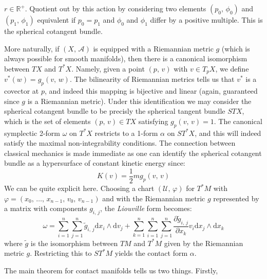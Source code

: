     $r\in\mathbb{R}^{+}$. Quotient out by this action by considering two
    elements $(p_{0},\,\phi_{0})$ and $(p_{1},\,\phi_{1})$ equivalent if
    $p_{0}=p_{1}$ and $\phi_{0}$ and $\phi_{1}$ differ by a positive multiple.
    This is the spherical cotangent bundle.
    \par\hfill\par
    More naturally, if $(X,\,\mathcal{A})$ is equipped with a Riemannian metric
    $g$ (which is always possible for smooth manifolds), then there is a
    canonical isomorphism between $TX$ and $T^{*}X$. Namely, given a point
    $(p,\,v)$ with $v\in{T}_{p}X$, we define
    $v^{*}(w)=g_{p}(v,\,w)$. The bilinearity of Riemannian metrics tells us
    that $v^{*}$ is a covector at $p$, and indeed this mapping is bijective
    and linear (again, guaranteed since $g$ is a Riemannian metric). Under this
    identification we may consider the spherical cotangent bundle to be
    precisly the spherical tangent bundle $STX$, which is the set of elements
    $(p,\,v)\in{TX}$ satisfying $g_{p}(v,\,v)=1$. The canonical symplectic
    2-form $\omega$ on $T^{*}X$ restricts to a 1-form $\alpha$ on
    $ST^{*}X$, and this will indeed satisfy the maximal non-integrability
    conditions. The connection between classical mechanics is made immediate
    as one can identify the spherical cotangent bundle as a hypersurface of
    constant kinetic energy since:
    \begin{equation}
        K(v)=\frac{1}{2}mg_{p}(v,\,v)
    \end{equation}
    We can be quite explicit here. Choosing a chart
    $(\mathcal{U},\,\varphi)$ for $T^{*}M$ with
    $\varphi=(x_{0},\,\dots,\,x_{n-1},\,v_{0},\,v_{n-1})$ and with the
    Riemannian metric $g$ represented by a matrix with components
    $g_{i,\,j}$, the \textit{Liouville} form becomes:
    \begin{equation}
        \omega=\sum_{i=1}^{n}\sum_{j=1}^{n}
            \tilde{g}_{i,\,j}\textrm{d}x_{i}\land\textrm{d}v_{j}+
        \sum_{k=1}^{n}\sum_{i=1}^{n}\sum_{j=1}^{n}
            \frac{\partial\tilde{g}_{i,\,j}}{\partial{x}_{k}}
            v_{i}\textrm{d}x_{j}\land\textrm{d}x_{k}
    \end{equation}
    where $\tilde{g}$ is the isomorphism between $TM$ and $T^{*}M$ given by
    the Riemannian metric $g$.
    Restricting this to $ST^{*}M$ yields the contact form $\alpha$.
    \par\hfill\par
    The main theorem for contact manifolds tells us two things. Firstly,
